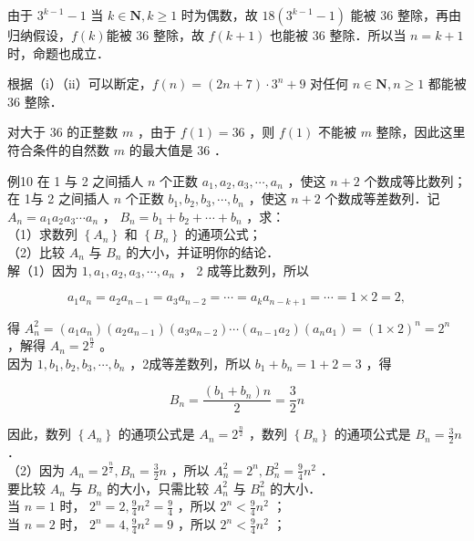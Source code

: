 \documentclass[10pt]{article}
\begin{document}
由于 \(3^{k-1}-1\) 当 \(k \in \mathbf{N}, k \geqslant 1\) 时为偶数，故 \(18\left(3^{k-1}-1\right)\) 能被 36 整除，再由归纳假设，\(f(k)\)能被 36 整除，故 \(f(k+1)\) 也能被 36 整除．所以当 \(n=k+1\) 时，命题也成立．

根据（i）（ii）可以断定，\(f(n)=(2 n+7) \cdot 3^{n}+9\) 对任何 \(n \in \mathbf{N}, n \geqslant 1\) 都能被 36 整除．

对大于 36 的正整数 \(m\) ，由于 \(f(1)=36\) ，则 \(f(1)\) 不能被 \(m\) 整除，因此这里符合条件的自然数 \(m\) 的最大值是 36 ．

例10 在 1 与 2 之间插人 \(n\) 个正数 \(a_{1}, a_{2}, a_{3}, \cdots, a_{n}\) ，使这 \(n+2\) 个数成等比数列；在 1与 2 之间插人 \(n\) 个正数 \(b_{1}, b_{2}, b_{3}, \cdots, b_{n}\) ，使这 \(n+2\) 个数成等差数列．记 \(A_{n}=a_{1} a_{2} a_{3} \cdots a_{n}\) ， \(B_{n}=b_{1}+b_{2}+\cdots+b_{n}\) ，求：\\
（1）求数列 \(\left\{A_{n}\right\}\) 和 \(\left\{B_{n}\right\}\) 的通项公式；\\
（2）比较 \(A_{n}\) 与 \(B_{n}\) 的大小，并证明你的结论．\\
解（1）因为 \(1, a_{1}, a_{2}, a_{3}, \cdots, a_{n}\) ， 2 成等比数列，所以

\[
a_{1} a_{n}=a_{2} a_{n-1}=a_{3} a_{n-2}=\cdots=a_{k} a_{n-k+1}=\cdots=1 \times 2=2,
\]

得 \(A_{n}^{2}=\left(a_{1} a_{n}\right)\left(a_{2} a_{n-1}\right)\left(a_{3} a_{n-2}\right) \cdots\left(a_{n-1} a_{2}\right)\left(a_{n} a_{1}\right)=(1 \times 2)^{n}=2^{n}\) ，解得 \(A_{n}=2^{\frac{n}{2}}\) 。\\
因为 \(1, b_{1}, b_{2}, b_{3}, \cdots, b_{n}\) ，2成等差数列，所以 \(b_{1}+b_{n}=1+2=3\) ，得

\[
B_{n}=\frac{\left(b_{1}+b_{n}\right) n}{2}=\frac{3}{2} n
\]

因此，数列 \(\left\{A_{n}\right\}\) 的通项公式是 \(A_{n}=2^{\frac{n}{2}}\) ，数列 \(\left\{B_{n}\right\}\) 的通项公式是 \(B_{n}=\frac{3}{2} n\) ．\\
（2）因为 \(A_{n}=2^{\frac{n}{2}}, B_{n}=\frac{3}{2} n\) ，所以 \(A_{n}^{2}=2^{n}, B_{n}^{2}=\frac{9}{4} n^{2}\) ．\\
要比较 \(A_{n}\) 与 \(B_{n}\) 的大小，只需比较 \(A_{n}^{2}\) 与 \(B_{n}^{2}\) 的大小．\\
当 \(n=1\) 时， \(2^{n}=2, \frac{9}{4} n^{2}=\frac{9}{4}\) ，所以 \(2^{n}<\frac{9}{4} n^{2}\) ；\\
当 \(n=2\) 时， \(2^{n}=4, \frac{9}{4} n^{2}=9\) ，所以 \(2^{n}<\frac{9}{4} n^{2}\) ；
\end{document}
